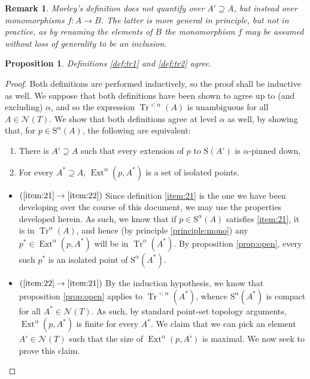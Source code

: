\documentclass{article}
\newtheorem{prop}[theorem]{Proposition}
\newtheorem{remark}[theorem]{Remark}
\theoremstyle{nonumberplain}
\newtheorem{proof}{Proof}
\newcommand{\calN}{\mathcal{N}}
\newcommand{\Stone}{\mathrm{S}}
\DeclareMathOperator{\Tr}{Tr}
\DeclareMathOperator{\Ext}{Ext}
\begin{document}
\begin{remark}
Morley's definition does not quantify over $A' \supseteq A$, but instead over monomorphisms $f \colon A \to B$. The latter is more general in principle, but not in practice, as by renaming the elements of $B$ the monomorphism $f$ may be assumed without loss of generality to be an inclusion.
\end{remark}

\begin{prop}
Definitions \ref{def:tr1} and \ref{def:tr2} agree.
\end{prop}

\begin{proof}
Both definitions are performed inductively, so the proof shall be inductive as well. We suppose that both definitions have been shown to agree up to (and excluding) $\alpha$, and so the expression $\Tr^{<\alpha}(A)$ is unambiguous for all $A \in \calN(T)$. We show that both definitions agree at level $\alpha$ as well, by showing that, for $p \in \Stone^\alpha(A)$, the following are equivalent:
\begin{enumerate}
\item \label{item:21} There is $A' \supseteq A$ such that every extension of $p$ to $\Stone(A')$ is $\alpha$-pinned down,
\item \label{item:22} For every $A^* \supseteq A$, $\Ext^\alpha(p,A^*)$ is a set of isolated points.
\end{enumerate}

\begin{itemize}
\item $(\ref{item:21} \rightarrow \ref{item:22})$ Since definition \ref{item:21} is the one we have been developing over the course of this document, we may use the properties developed herein. As such, we know that if $p \in \Stone^\alpha(A)$ satisfies \ref{item:21}, it is in $\Tr^\alpha(A)$, and hence (by principle \ref{principle:mono}) any $p^* \in \Ext^\alpha(p, A^*)$ will be in $\Tr^\alpha(A^*)$. By proposition \ref{prop:open}, every such $p^*$ is an isolated point of $\Stone^\alpha(A^*)$.

\item $(\ref{item:22} \rightarrow \ref{item:21})$ By the induction hypothesis, we know that proposition \ref{prop:open} applies to $\Tr^{<\alpha}(A^*)$, whence $\Stone^\alpha(A^*)$ is compact for all $A^* \in \calN(T)$. As such, by standard point-set topology arguments, $\Ext^\alpha(p,A^*)$ is finite for every $A^*$. We claim that we can pick an element $A' \in \calN(T)$ such that the size of $\Ext^\alpha(p,A')$ is maximal. We now seek to prove this claim.


\end{itemize}
\end{proof}
\end{document}
